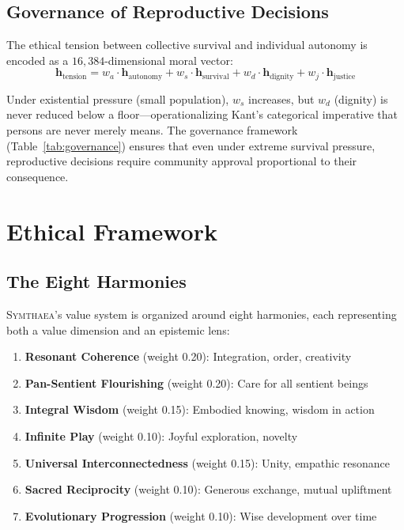\documentclass[11pt,letterpaper]{article}
\newcommand{\hv}{\mathbf{h}}
\newcommand{\dimHDC}{16{,}384}
\newcommand{\symthaea}{\textsc{Symthaea}}
\begin{document}
\subsection{Governance of Reproductive Decisions}

The ethical tension between collective survival and individual autonomy is
encoded as a $\dimHDC$-dimensional moral vector:
\begin{equation}
\hv_\text{tension} = w_a \cdot \hv_\text{autonomy} + w_s \cdot \hv_\text{survival} + w_d \cdot \hv_\text{dignity} + w_j \cdot \hv_\text{justice}
\label{eq:tension}
\end{equation}

Under existential pressure (small population), $w_s$ increases, but
$w_d$ (dignity) is never reduced below a floor---operationalizing Kant's
categorical imperative that persons are never merely means. The governance
framework (Table~\ref{tab:governance}) ensures that even under extreme survival
pressure, reproductive decisions require community approval proportional to their
consequence.


\section{Ethical Framework}
\label{sec:ethics}

\subsection{The Eight Harmonies}

\symthaea{}'s value system is organized around eight harmonies, each representing
both a value dimension and an epistemic lens:

\begin{enumerate}[nosep,leftmargin=2em]
\item \textbf{Resonant Coherence} (weight 0.20): Integration, order, creativity
\item \textbf{Pan-Sentient Flourishing} (weight 0.20): Care for all sentient beings
\item \textbf{Integral Wisdom} (weight 0.15): Embodied knowing, wisdom in action
\item \textbf{Infinite Play} (weight 0.10): Joyful exploration, novelty
\item \textbf{Universal Interconnectedness} (weight 0.15): Unity, empathic resonance
\item \textbf{Sacred Reciprocity} (weight 0.10): Generous exchange, mutual upliftment
\item \textbf{Evolutionary Progression} (weight 0.10): Wise development over time
\end{enumerate}
\end{document}
